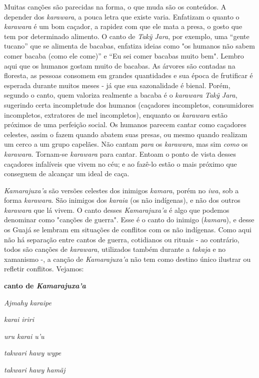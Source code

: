 Muitas canções são parecidas na forma, o que muda são os conteúdos. A
depender dos \emph{karawara}, a pouca letra que existe varia. Enfatizam
o quanto o \emph{karawara} é um bom caçador, a rapidez com que ele mata
a presa, o gosto que tem por determinado alimento. O canto de
\emph{Takỹ} \emph{Jara}, por exemplo, uma ``gente tucano'' que se
alimenta de bacabas, enfatiza ideias como "os humanos não sabem comer
bacaba (como ele come)'' e ``Eu sei comer bacabas muito bem". Lembro
aqui que os humanos gostam muito de bacabas. As árvores são contadas na
floresta, as pessoas consomem em grandes quantidades e sua época de
frutificar é esperada durante muitos meses - já que sua sazonalidade é
bienal. Porém, segundo o canto, quem valoriza realmente a bacaba é o
\emph{karawara} \emph{Takỹ} \emph{Jara}, sugerindo certa incompletude
dos humanos (caçadores incompletos, consumidores incompletos, extratores
de mel incompletos), enquanto os \emph{karawara} estão próximos de uma
perfeição social. Os humanos parecem cantar como caçadores celestes,
assim o fazem quando abatem suas presas, ou mesmo quando realizam um
cerco a um grupo capelães. Não cantam \emph{para} os \emph{karawara},
mas sim \emph{como} os \emph{karawara}. Tornam-se \emph{karawara} para
cantar. Entoam o ponto de vista desses caçadores infalíveis que vivem no
céu; e ao fazê-lo estão o mais próximo que conseguem de alcançar um
ideal de caça.

\emph{Kamarajuxa'a} são versões celestes dos inimigos \emph{kamara},
porém no \emph{iwa}, sob a forma \emph{karawara}. São inimigos dos
\emph{karaia} (os não indígenas), e não dos outros \emph{karawara} que
lá vivem. O canto desses \emph{Kamarajuxa'a} é algo que podemos
denominar como "canções de guerra". Esse é o canto do inimigo
(\emph{kamara}), e desse os Guajá se lembram em situações de conflitos
com os não indígenas. Como aqui não há separação entre cantos de guerra,
cotidianos ou rituais - ao contrário, todos são canções de
\emph{karawara}, utilizados também durante a \emph{takaja} e no
xamanismo -, a canção de \emph{Kamarajuxa'a} não tem como destino único
ilustrar ou refletir conflitos. Vejamos:

\textbf{canto de \emph{Kamarajuxa'a}}

\emph{Ajmahy karaipe}

\emph{karai iriri}

\emph{uru karai u'u}

\emph{takwari hawy wype}

\emph{takwari hawy hamãj}

